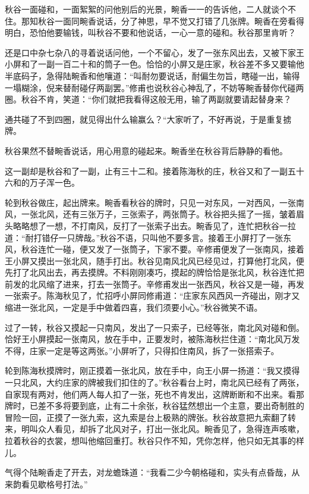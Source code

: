 \documentclass[12pt,UTF8]{ctexbook}
\begin{document}
{{{秋谷一面碰和，一面絮絮的问他别后的光景，畹香一一的告诉他，二人就谈个不住。那知秋谷一面同畹香说话，分了神思，早不觉又打错了几张牌。畹香在旁看得明白，恐怕他要输钱，叫秋谷不要和他说话，一心一意的碰和。秋谷那里肯听？

还是口中杂七杂八的寻着说话问他，一个不留心，发了一张东风出去，又被下家王小屏和了一副一百二十和的筒子一色。恰恰的小屏又是庄家，秋谷差不多又要输他半底码子，急得陆畹香和他嚷道：“叫耐勿要说话，耐偏生勿旨，瞎碰一出，输得一塌糊涂，倪来替耐碰仔两副罢。”修甫也说秋谷心神乱了，不妨等畹香替你代碰两圈。秋谷不肯，笑道：“你们就把我看得这般无用，输了两副就要请起替身来？

通共碰了不到四圈，就见得出什么输赢么？“大家听了，不好再说，于是重复掳牌。

秋谷果然不替畹香说话，用心用意的碰起来。畹香坐在秋谷背后静静的看他。

这一副却是秋谷和了一副，止有三十二和。接着陈海秋的庄，秋谷又和了一副五十六和的万子浑一色。

轮到秋谷做庄，起出牌来。畹香看秋谷的牌时，只见一对东风，一对西风，一张南风，一张北风，还有三张万子，三张索子，两张筒子。秋谷把头摇了一摇，皱着眉头略略想了一想，不打南风，反打了一张索子出去。畹香见了，连忙把秋谷一拉道：“耐打错仔一只牌哉。”秋谷不语，只叫他不要多言。接着王小屏打了一张东风，秋谷连忙一碰，便又发了一张筒子，下家不要。辛修甫便发了一张南风，接着王小屏又摸出一张北风，随手打出。秋谷见南风北风已经见过，打算他打北风，便先打了北风出去，再去摸牌。不料刚刚凑巧，摸起的牌恰恰是张北风，秋谷连忙把前发的北风缩了进来，打去一张筒子。辛修甫发出一张西风，秋谷又是一碰，再发一张索子。陈海秋见了，忙招呼小屏同修甫道：“庄家东风西风一齐碰出，刚才又缩进一张北风，一定是手中做着四喜，我们须要小心。”秋谷微笑不语。

过了一转，秋谷又摸起一只南风，发出了一只索子，已经等张，南北风对碰和倒。恰好王小屏摸起一张南风，放在手中，正要发时，被陈海秋拦住道：“南北风万发不得，庄家一定是等这两张。”小屏听了，只得扣住南风，拆了一张搭索子。

轮到陈海秋摸牌时，刚正摸着一张北风，放在手中，向王小屏一扬道：“我又摸得一只北风，大约庄家的牌被我们扣住的了。”秋谷看台上时，南北风已经有了两张，自家现有两对，他们两人每人扣了一张，死也不肯发出，这牌断断和不出来。看那牌时，已差不多将要到底，止有二十余张，秋谷猛然想出一个主意，要出奇制胜的冒险一回，正摸了一张九索，这九索是台上极熟的牌张。秋谷故意把九索翻了转来，明叫众人看见，却拆了北风对子，打出一张北风。畹香见了，急得连声咳嗽，拉着秋谷的衣裳，想叫他缩回重打。秋谷只作不知，凭你怎样，他只如无其事的样儿。

气得个陆畹香走了开去，对龙蟾珠道：“我看二少今朝格碰和，实头有点昏哉，从来韵看见歇格号打法。”

}}}
\end{document}

